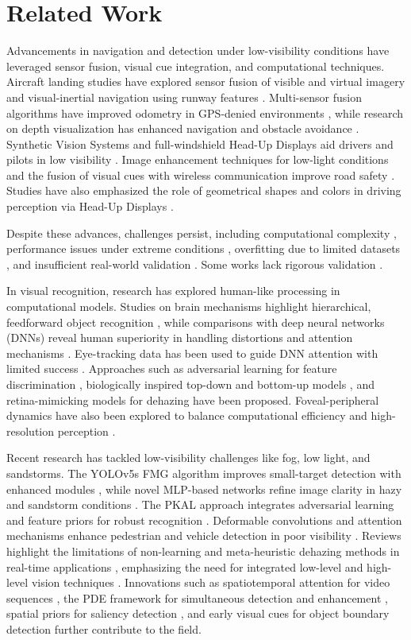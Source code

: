 \section{Related Work}
\label{sec:related_work}
Advancements in navigation and detection under low-visibility conditions have leveraged sensor fusion, visual cue integration, and computational techniques. Aircraft landing studies have explored sensor fusion of visible and virtual imagery \citep{b1} and visual-inertial navigation using runway features \citep{b2}. Multi-sensor fusion algorithms have improved odometry in GPS-denied environments \citep{b3}, while research on depth visualization has enhanced navigation and obstacle avoidance \citep{b4}. Synthetic Vision Systems and full-windshield Head-Up Displays aid drivers and pilots in low visibility \citep{b5,b8}. Image enhancement techniques for low-light conditions \citep{b6} and the fusion of visual cues with wireless communication improve road safety \citep{b7}. Studies have also emphasized the role of geometrical shapes and colors in driving perception via Head-Up Displays \citep{b9}.

Despite these advances, challenges persist, including computational complexity \citep{b2,b6,b10}, performance issues under extreme conditions \citep{b3,b7}, overfitting due to limited datasets \citep{b2,b3}, and insufficient real-world validation \citep{b1,b7,b10}. Some works lack rigorous validation \citep{b5,b9}.

In visual recognition, research has explored human-like processing in computational models. Studies on brain mechanisms highlight hierarchical, feedforward object recognition \citep{b11}, while comparisons with deep neural networks (DNNs) reveal human superiority in handling distortions and attention mechanisms \citep{b12,b13}. Eye-tracking data has been used to guide DNN attention with limited success \citep{b14}. Approaches such as adversarial learning for feature discrimination \citep{b15}, biologically inspired top-down and bottom-up models \citep{b16}, and retina-mimicking models for dehazing \citep{b17} have been proposed. Foveal-peripheral dynamics have also been explored to balance computational efficiency and high-resolution perception \citep{b18}.

Recent research has tackled low-visibility challenges like fog, low light, and sandstorms. The YOLOv5s FMG algorithm improves small-target detection with enhanced modules \citep{b21}, while novel MLP-based networks refine image clarity in hazy and sandstorm conditions \citep{b22}. The PKAL approach integrates adversarial learning and feature priors for robust recognition \citep{b23}. Deformable convolutions and attention mechanisms enhance pedestrian and vehicle detection in poor visibility \citep{b24}. Reviews highlight the limitations of non-learning and meta-heuristic dehazing methods in real-time applications \citep{b25}, emphasizing the need for integrated low-level and high-level vision techniques \citep{b26}. Innovations such as spatiotemporal attention for video sequences \citep{b27}, the PDE framework for simultaneous detection and enhancement \citep{b28}, spatial priors for saliency detection \citep{b29}, and early visual cues for object boundary detection \citep{b30} further contribute to the field.

